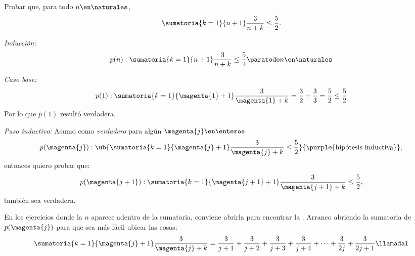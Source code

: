 \begin{enunciado}{\ejExtra}
  Probar que, para todo $n \en \naturales$,
  $$
    \sumatoria{k=1}{n+1} \frac{3}{n+k} \leq \frac{5}{2}.
  $$
\end{enunciado}

\textit{Inducción: }
$$
  p(n): \sumatoria{k=1}{n+1} \frac{3}{n+k} \leq \frac{5}{2}
  \paratodo n \en \naturales
$$

\textit{Caso base: }
$$
  p(1):
  \sumatoria{k=1}{\magenta{1}+1} \frac{3}{\magenta{1} + k} =
  \frac{3}{2} + \frac{3}{3} =
  \frac{5}{2}
  \leq
  \frac{5}{2}
$$
Por lo que $p(1)$ resultó verdadera.

\textit{Paso inductivo: }
Asumo como \textit{verdadero} para algún $\magenta{j} \en \enteros$
$$
  p(\magenta{j}): \ub{\sumatoria{k=1}{\magenta{j} + 1} \frac{3}{\magenta{j} + k} \leq \frac{5}{2}}{\text{\purple{hipótesis inductiva}}},
$$
entonces quiero probar que:
$$
  p(\magenta{j + 1}):
  \sumatoria{k=1}{\magenta{j + 1} + 1} \frac{3}{\magenta{j+1} + k} \leq
  \frac{5}{2},
$$
también  sea verdadera.

\bigskip

En los ejercicios donde la $n$ aparece adentro de la sumatoria, conviene abrirla para encontrar la
. Arranco abriendo la sumatoria de $p(\magenta{j})$ para que sea más fácil ubicar las cosas:
$$
  \sumatoria{k=1}{\magenta{j} + 1} \frac{3}{\magenta{j} + k} =
  \frac{3}{j+1} +
  \frac{3}{j+2} +
  \frac{3}{j+3} +
  \frac{3}{j+4} +
  \dots +
  \frac{3}{2j} +
  \frac{3}{2j+1}
  \llamada1
$$

